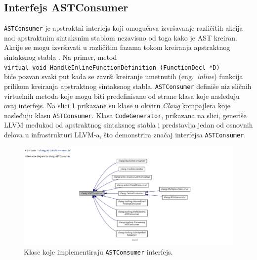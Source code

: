 \documentclass[12pt,oneside]{memoir}
\begin{document}
\subsection{Interfejs ASTConsumer}

\texttt{ASTConsumer} je apstraktni interfejs koji omogu\'{c}ava izvr\v{s}avanje razli\v{c}itih akcija nad apstraktnim sintaksnim stablom nezavisno od toga kako je AST kreiran.
Akcije se mogu izvr\v{s}avati u razli\v{c}itim fazama tokom kreiranja apstraktnog sintaksnog stabla \cite{ASTToolTutorial}. Na primer, metod \\ \texttt{virtual void  HandleInlineFunctionDefinition (FunctionDecl *D)} \\ bi\'{c}e pozvan svaki put kada se zavr\v{s}i kreiranje umetnutih (eng.~\textit{inline}) funkcija prilikom kreiranja apstraktnog sintaksnog stabla. \texttt{ASTConsumer} defini\v{s}e niz sli\v{c}nih virtuelnih metoda koje mogu biti predefinisane od strane klasa koje nasleđuju ovaj interfejs. 
Na slici \ref{fig:inhDiagram} prikazane su klase u okviru \textit{Clang} kompajlera koje nasleđuju klasu \texttt{ASTConsumer}. Klasa \texttt{CodeGenerator}, prikazana na slici,
generi\v{s}e LLVM međukod od apstraktnog sintaksnog stabla i predstavlja jedan od osnovnih delova u infrastrukturi LLVM-a, \v{s}to demonstrira zna\v{c}aj interfejsa \texttt{ASTConsumer}. 

\begin{figure}[!h]
\begin{center}
\includegraphics[scale=0.3]{ASTConsumer2.png}
\end{center}
\caption{Klase koje implementiraju \texttt{ASTConsumer} interfejs.}
\label{fig:inhDiagram}
\end{figure}
\end{document}

